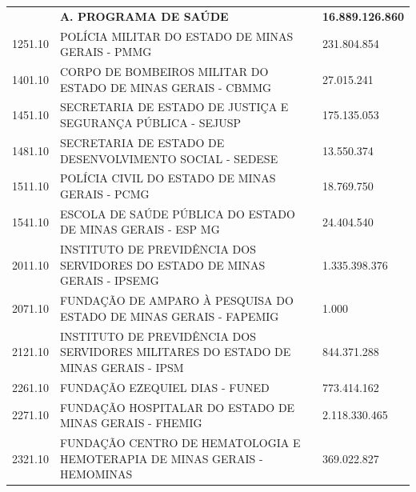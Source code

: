\documentclass{article}
\begin{document}
\begin{longtable}[c]{m{3cm}|m{12cm}|m{3cm}}
\multicolumn{1}{C{3cm}|}{ \textbf{}} & \multicolumn{1}{L{12cm}|}{ \textbf{A. PROGRAMA DE SAÚDE}} & \multicolumn{1}{R{3cm}}{ \textbf{16.889.126.860}} \\
\multicolumn{1}{C{3cm}|}{1251.10} & \multicolumn{1}{L{12cm}|}{POLÍCIA MILITAR DO ESTADO DE MINAS GERAIS - PMMG} & \multicolumn{1}{R{3cm}}{231.804.854} \\
\multicolumn{1}{C{3cm}|}{1401.10} & \multicolumn{1}{L{12cm}|}{CORPO DE BOMBEIROS MILITAR DO ESTADO DE MINAS GERAIS - CBMMG} & \multicolumn{1}{R{3cm}}{27.015.241} \\
\multicolumn{1}{C{3cm}|}{1451.10} & \multicolumn{1}{L{12cm}|}{SECRETARIA DE ESTADO DE JUSTIÇA E SEGURANÇA PÚBLICA - SEJUSP} & \multicolumn{1}{R{3cm}}{175.135.053} \\
\multicolumn{1}{C{3cm}|}{1481.10} & \multicolumn{1}{L{12cm}|}{SECRETARIA DE ESTADO DE DESENVOLVIMENTO SOCIAL - SEDESE} & \multicolumn{1}{R{3cm}}{13.550.374} \\
\multicolumn{1}{C{3cm}|}{1511.10} & \multicolumn{1}{L{12cm}|}{POLÍCIA CIVIL DO ESTADO DE MINAS GERAIS - PCMG} & \multicolumn{1}{R{3cm}}{18.769.750} \\
\multicolumn{1}{C{3cm}|}{1541.10} & \multicolumn{1}{L{12cm}|}{ESCOLA DE SAÚDE PÚBLICA DO ESTADO DE MINAS GERAIS - ESP MG} & \multicolumn{1}{R{3cm}}{24.404.540} \\
\multicolumn{1}{C{3cm}|}{2011.10} & \multicolumn{1}{L{12cm}|}{INSTITUTO DE PREVIDÊNCIA DOS SERVIDORES DO ESTADO DE MINAS GERAIS - IPSEMG} & \multicolumn{1}{R{3cm}}{1.335.398.376} \\
\multicolumn{1}{C{3cm}|}{2071.10} & \multicolumn{1}{L{12cm}|}{FUNDAÇÃO DE AMPARO À PESQUISA DO ESTADO DE MINAS GERAIS - FAPEMIG} & \multicolumn{1}{R{3cm}}{1.000} \\
\multicolumn{1}{C{3cm}|}{2121.10} & \multicolumn{1}{L{12cm}|}{INSTITUTO DE PREVIDÊNCIA DOS SERVIDORES MILITARES DO ESTADO DE MINAS GERAIS - IPSM} & \multicolumn{1}{R{3cm}}{844.371.288} \\
\multicolumn{1}{C{3cm}|}{2261.10} & \multicolumn{1}{L{12cm}|}{FUNDAÇÃO EZEQUIEL DIAS - FUNED} & \multicolumn{1}{R{3cm}}{773.414.162} \\
\multicolumn{1}{C{3cm}|}{2271.10} & \multicolumn{1}{L{12cm}|}{FUNDAÇÃO HOSPITALAR DO ESTADO DE MINAS GERAIS - FHEMIG} & \multicolumn{1}{R{3cm}}{2.118.330.465} \\
\multicolumn{1}{C{3cm}|}{2321.10} & \multicolumn{1}{L{12cm}|}{FUNDAÇÃO CENTRO DE HEMATOLOGIA E HEMOTERAPIA DE MINAS GERAIS - HEMOMINAS} & \multicolumn{1}{R{3cm}}{369.022.827} \\

\end{longtable}
\end{document}
